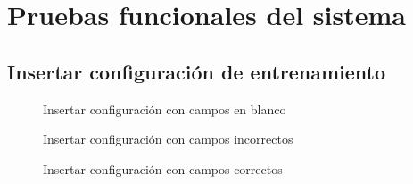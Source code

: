 {\chapter{Pruebas funcionales del sistema}

\section{Insertar configuración de entrenamiento}
\begin{figure}[H]
\centering
 \caption{Insertar configuración con campos en blanco}
 \label{fig:cb} 
\end{figure}

\begin{figure}[H]
\centering
 \caption{Insertar configuración con campos incorrectos}
 \label{fig:ci} 
\end{figure}

\begin{figure}[H]
\centering
 \caption{Insertar configuración con campos correctos}
 \label{fig:cc} 
\end{figure}

}
